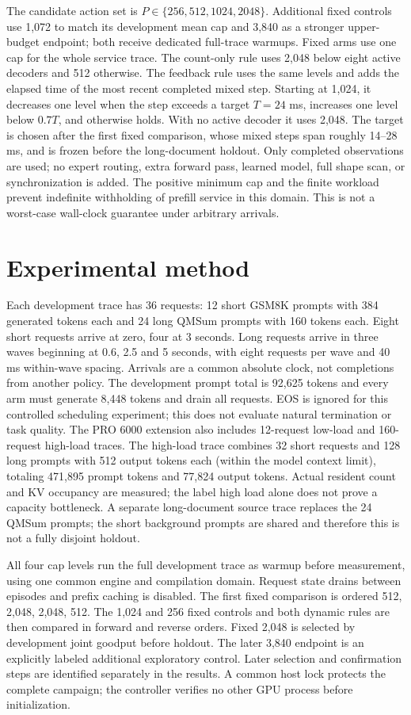 \documentclass[10pt,a4paper]{article}
\begin{document}
The candidate action set is $P\in\{256,512,1024,2048\}$. Additional fixed
controls use 1,072 to match its development mean cap and 3,840 as a stronger
upper-budget endpoint; both receive dedicated full-trace warmups. Fixed arms use one cap for the
whole service trace. The count-only rule uses 2,048 below eight active decoders
and 512 otherwise. The feedback rule uses the same levels and adds the elapsed
time of the most recent completed mixed step. Starting at 1,024, it decreases
one level when the step exceeds a target $T=24$ ms, increases one level below $0.7T$,
and otherwise holds. With no active decoder it uses 2,048. The target is chosen after the first fixed comparison, whose mixed steps
span roughly 14--28 ms, and is frozen before the long-document holdout.
Only completed observations are used; no expert routing, extra forward pass, learned model,
full shape scan, or synchronization is added. The positive minimum cap and the
finite workload prevent indefinite withholding of prefill service in this domain.
This is not a worst-case wall-clock guarantee under arbitrary arrivals.

\section{Experimental method}
Each development trace has 36 requests: 12 short GSM8K prompts with 384 generated
tokens each and 24 long QMSum prompts with 160 tokens each. Eight short requests
arrive at zero, four at 3 seconds. Long requests arrive in three waves beginning
at 0.6, 2.5 and 5 seconds, with eight requests per wave and 40 ms within-wave
spacing. Arrivals are a common absolute clock, not completions from another
policy. The development prompt total is 92,625 tokens and every arm must generate
8,448 tokens and drain all requests. EOS is ignored for this controlled
scheduling experiment; this does not evaluate natural termination or task quality.
The PRO 6000 extension also includes 12-request low-load and 160-request high-load
traces. The high-load trace combines 32 short requests and 128 long prompts with
512 output tokens each (within the model context limit), totaling 471,895 prompt
tokens and 77,824 output tokens. Actual resident count and KV occupancy are
measured; the label high load alone does not prove a capacity bottleneck.
A separate long-document source trace replaces the 24 QMSum prompts; the short
background prompts are shared and therefore this is not a fully disjoint holdout.

All four cap levels run the full development trace as warmup before measurement,
using one common engine and compilation domain. Request state drains between
episodes and prefix caching is disabled. The first fixed comparison is ordered
512, 2,048, 2,048, 512. The 1,024 and 256 fixed controls and both dynamic rules are then compared
in forward and reverse orders. Fixed 2,048 is selected by development joint
goodput before holdout. The later 3,840 endpoint is an explicitly labeled
additional exploratory control. Later selection and confirmation steps are identified
separately in the results. A common host lock protects the complete campaign;
the controller verifies no other GPU process before initialization.
\end{document}
